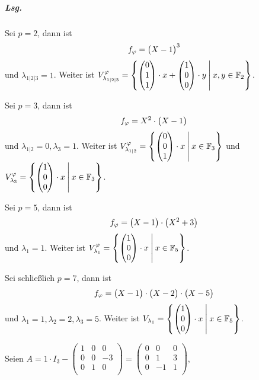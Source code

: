 \documentclass{scrreprt}
\begin{document}
\begin{enumerate}[(i)]
  \subparagraph{Lsg.} Sei $p = 2$, dann ist
  \[
    f_{\varphi} = \qty\big(X - 1)^3
  \]
  und $\lambda_{1|2|3} = 1$.
  Weiter ist $V_{\lambda_{1|2|3}}^{\varphi} = \qty{
    \begin{pmatrix}0\\1\\1\end{pmatrix} \cdot x +
    \begin{pmatrix}1\\0\\0\end{pmatrix} \cdot y
    \:\middle |\:
    x, y \in \mathbb{F}_2
  }$.

  Sei $p = 3$, dann ist
  \[
    f_{\varphi} = X^2 \cdot \qty\big(X - 1)
  \]
  und $\lambda_{1|2} = 0, \lambda_3 = 1$.
  Weiter ist $V_{\lambda_{1|2}}^{\varphi} = \qty{
    \begin{pmatrix}0\\0\\1\end{pmatrix} \cdot x
    \:\middle |\:
    x \in \mathbb{F}_3
  }$ und $V_{\lambda_3}^{\varphi} = \qty{
    \begin{pmatrix}1\\0\\0\end{pmatrix} \cdot x
    \:\middle |\:
    x \in \mathbb{F}_3
  }$.

  Sei $p = 5$, dann ist
  \[
    f_{\varphi} = \qty\big(X - 1) \cdot \qty\big(X^2 + 3)
  \]
  und $\lambda_1 = 1$.
  Weiter ist $V_{\lambda_1}^{\varphi} = \qty{
      \begin{pmatrix}1\\0\\0\end{pmatrix} \cdot x
      \:\middle |\:
      x \in \mathbb{F}_5
  }$.

  Sei schließlich $p = 7$, dann ist
  \[
    f_{\varphi} = \qty\big(X - 1) \cdot \qty\big(X - 2) \cdot \qty\big(X - 5)
  \]
  und $\lambda_1 = 1, \lambda_2 = 2, \lambda_3 = 5$.
  Weiter ist $V_{\lambda_1} = \qty{
    \begin{pmatrix}1\\0\\0\end{pmatrix} \cdot x
    \:\middle |\:
    x \in \mathbb{F}_5
  }$.

  Seien $A = 1 \cdot I_3 - \begin{pmatrix}
    1 & 0 & 0 \\
    0 & 0 & -3 \\
    0 & 1 & 0 \\
  \end{pmatrix} = \begin{pmatrix}
    0 & 0 & 0 \\
    0 & 1 & 3 \\
    0 & -1 & 1 \\
  \end{pmatrix}$,


\end{enumerate}
\end{document}

